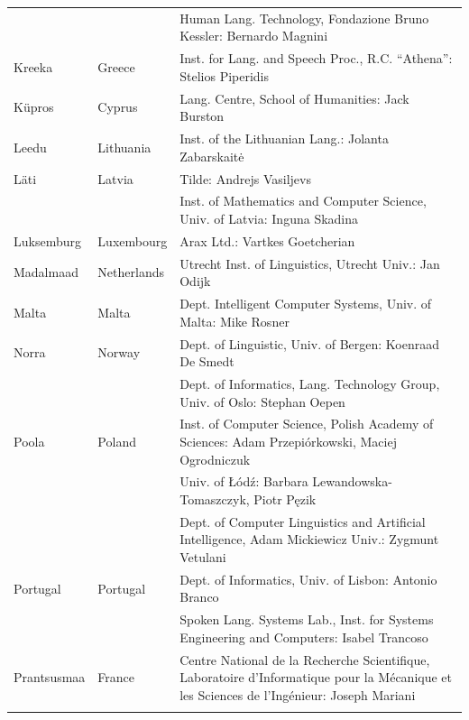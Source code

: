 \documentclass[]{../metanetpaper}
\begin{document}
\begin{longtable}{llp{105mm}}
  & & Human Lang. Technology, Fondazione Bruno Kessler: Bernardo Magnini\\ \addlinespace 
  Kreeka & \textcolor{grey1}{Greece} & Inst. for Lang. and Speech Proc., R.C. ``Athena'': Stelios Piperidis\\ \addlinespace
  Küpros & \textcolor{grey1}{Cyprus} & Lang. Centre, School of Humanities: Jack Burston\\ \addlinespace
  Leedu & \textcolor{grey1}{Lithuania} & Inst. of the Lithuanian Lang.: Jolanta Zabarskaitė\\ \addlinespace
  Läti & \textcolor{grey1}{Latvia} & Tilde: Andrejs Vasiljevs\\ \addlinespace 
  & & Inst. of Mathematics and Computer Science, Univ. of Latvia: Inguna Skadina\\ 
\addlinespace
  Luksemburg & \textcolor{grey1}{Luxembourg} & Arax Ltd.: Vartkes Goetcherian\\
\addlinespace 
  Madalmaad & \textcolor{grey1}{Netherlands} & Utrecht Inst. of Linguistics, Utrecht Univ.: Jan Odijk\\ 
 \addlinespace
  Malta & \textcolor{grey1}{Malta} & Dept. Intelligent Computer Systems, Univ. of Malta: Mike Rosner\\ \addlinespace
  Norra & \textcolor{grey1}{Norway} & Dept. of Linguistic, Univ. of Bergen: Koenraad De Smedt\\ \addlinespace 
  & & Dept. of Informatics, Lang. Technology Group, Univ. of Oslo: Stephan Oepen \\ \addlinespace
  Poola & \textcolor{grey1}{Poland} & Inst. of Computer Science, Polish Academy of Sciences: Adam Przepiórkowski, Maciej Ogrodniczuk \\ \addlinespace
  & & Univ. of Łódź: Barbara Lewandowska-Tomaszczyk, Piotr Pęzik\\ \addlinespace
  & & Dept. of Computer Linguistics and Artificial Intelligence, Adam Mickiewicz Univ.: Zygmunt Vetulani \\ \addlinespace
  Portugal & \textcolor{grey1}{Portugal} & Dept. of Informatics, Univ. of Lisbon: Antonio Branco\\ \addlinespace
  & & Spoken Lang. Systems Lab., Inst. for Systems Engineering and Computers: Isabel Trancoso \\ \addlinespace
  Prantsusmaa & \textcolor{grey1}{France} & Centre National de la Recherche Scientifique, Laboratoire d'Informatique pour la Mécanique et les Sciences de l'Ingénieur: Joseph Mariani \\ \addlinespace

\end{longtable}
\end{document}
